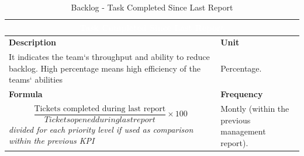 \begin{table}[H]
    \centering
    \renewcommand{\arraystretch}{1.6}
    \setlength{\arrayrulewidth}{0.6pt}

    \begin{tabularx}{\textwidth}{|X|X|}
    \hline
    \multicolumn{2}{|c|}{\cellcolor{mcblue}\textcolor{white}{\textbf{Task Completed Since Last Report}}} \\ \hline

    \rowcolor{mclightgray}
    \textbf{Description} & \textbf{Unit} \\ \hline
    It indicates the team`s throughput and ability to reduce backlog. High percentage means high efficiency of the teams` abilities &
    Percentage. \\ \hline

    \rowcolor{mclightgray}
    \textbf{Formula} & \textbf{Frequency} \\ \hline
    \[
     \frac{\text{Tickets completed during last report}}{Tickets opened during last report} \times 100
    \]
    \textit{divided for each priority level if used as comparison within the previous KPI}
     &
    Montly (within the previous management report). \\ \hline

    \end{tabularx}

    \caption{Backlog - Task Completed Since Last Report}
    \label{tab:TaskCompletedLastReport}
\end{table}
